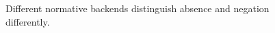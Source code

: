 \begin{figure}[H]
\centering
{}
\caption{Different normative backends distinguish absence and negation differently.}\label{fig:teach-P-02-literature-04}
\end{figure}

